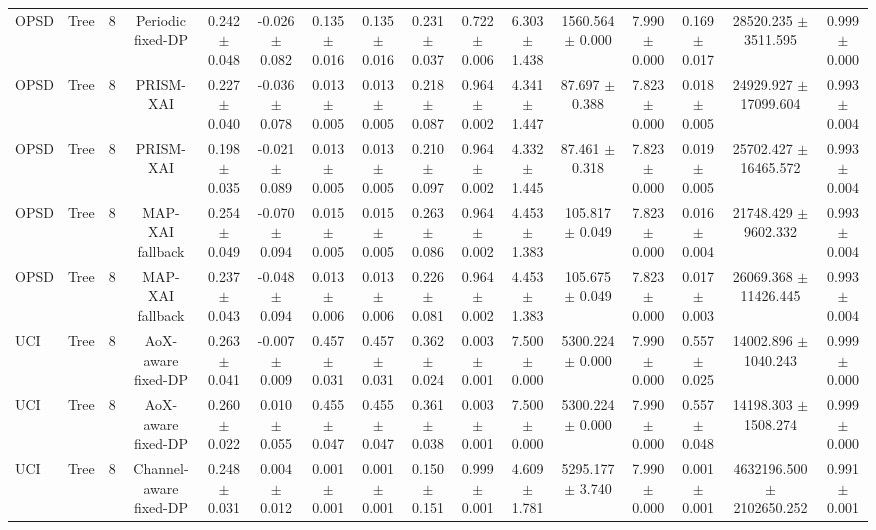 \begin{tabular}{lccccccccccccccc}
OPSD & Tree & 8 & Periodic fixed-DP & 0.242 $\pm$ 0.048 & -0.026 $\pm$ 0.082 & 0.135 $\pm$ 0.016 & 0.135 $\pm$ 0.016 & 0.231 $\pm$ 0.037 & 0.722 $\pm$ 0.006 & 6.303 $\pm$ 1.438 & 1560.564 $\pm$ 0.000 & 7.990 $\pm$ 0.000 & 0.169 $\pm$ 0.017 & 28520.235 $\pm$ 3511.595 & 0.999 $\pm$ 0.000 \\
OPSD & Tree & 8 & PRISM-XAI & 0.227 $\pm$ 0.040 & -0.036 $\pm$ 0.078 & 0.013 $\pm$ 0.005 & 0.013 $\pm$ 0.005 & 0.218 $\pm$ 0.087 & 0.964 $\pm$ 0.002 & 4.341 $\pm$ 1.447 & 87.697 $\pm$ 0.388 & 7.823 $\pm$ 0.000 & 0.018 $\pm$ 0.005 & 24929.927 $\pm$ 17099.604 & 0.993 $\pm$ 0.004 \\
OPSD & Tree & 8 & PRISM-XAI & 0.198 $\pm$ 0.035 & -0.021 $\pm$ 0.089 & 0.013 $\pm$ 0.005 & 0.013 $\pm$ 0.005 & 0.210 $\pm$ 0.097 & 0.964 $\pm$ 0.002 & 4.332 $\pm$ 1.445 & 87.461 $\pm$ 0.318 & 7.823 $\pm$ 0.000 & 0.019 $\pm$ 0.005 & 25702.427 $\pm$ 16465.572 & 0.993 $\pm$ 0.004 \\
OPSD & Tree & 8 & MAP-XAI fallback & 0.254 $\pm$ 0.049 & -0.070 $\pm$ 0.094 & 0.015 $\pm$ 0.005 & 0.015 $\pm$ 0.005 & 0.263 $\pm$ 0.086 & 0.964 $\pm$ 0.002 & 4.453 $\pm$ 1.383 & 105.817 $\pm$ 0.049 & 7.823 $\pm$ 0.000 & 0.016 $\pm$ 0.004 & 21748.429 $\pm$ 9602.332 & 0.993 $\pm$ 0.004 \\
OPSD & Tree & 8 & MAP-XAI fallback & 0.237 $\pm$ 0.043 & -0.048 $\pm$ 0.094 & 0.013 $\pm$ 0.006 & 0.013 $\pm$ 0.006 & 0.226 $\pm$ 0.081 & 0.964 $\pm$ 0.002 & 4.453 $\pm$ 1.383 & 105.675 $\pm$ 0.049 & 7.823 $\pm$ 0.000 & 0.017 $\pm$ 0.003 & 26069.368 $\pm$ 11426.445 & 0.993 $\pm$ 0.004 \\
UCI & Tree & 8 & AoX-aware fixed-DP & 0.263 $\pm$ 0.041 & -0.007 $\pm$ 0.009 & 0.457 $\pm$ 0.031 & 0.457 $\pm$ 0.031 & 0.362 $\pm$ 0.024 & 0.003 $\pm$ 0.001 & 7.500 $\pm$ 0.000 & 5300.224 $\pm$ 0.000 & 7.990 $\pm$ 0.000 & 0.557 $\pm$ 0.025 & 14002.896 $\pm$ 1040.243 & 0.999 $\pm$ 0.000 \\
UCI & Tree & 8 & AoX-aware fixed-DP & 0.260 $\pm$ 0.022 & 0.010 $\pm$ 0.055 & 0.455 $\pm$ 0.047 & 0.455 $\pm$ 0.047 & 0.361 $\pm$ 0.038 & 0.003 $\pm$ 0.001 & 7.500 $\pm$ 0.000 & 5300.224 $\pm$ 0.000 & 7.990 $\pm$ 0.000 & 0.557 $\pm$ 0.048 & 14198.303 $\pm$ 1508.274 & 0.999 $\pm$ 0.000 \\
UCI & Tree & 8 & Channel-aware fixed-DP & 0.248 $\pm$ 0.031 & 0.004 $\pm$ 0.012 & 0.001 $\pm$ 0.001 & 0.001 $\pm$ 0.001 & 0.150 $\pm$ 0.151 & 0.999 $\pm$ 0.001 & 4.609 $\pm$ 1.781 & 5295.177 $\pm$ 3.740 & 7.990 $\pm$ 0.000 & 0.001 $\pm$ 0.001 & 4632196.500 $\pm$ 2102650.252 & 0.991 $\pm$ 0.001 \\

\end{tabular}
